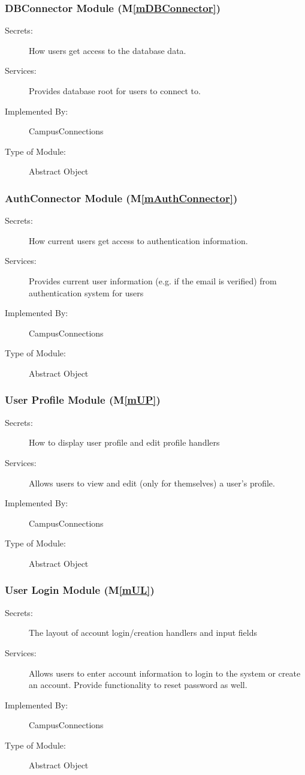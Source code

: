 \documentclass[12pt, titlepage]{article}
\newcommand{\mref}[1]{M\ref{#1}}
\begin{document}
\subsubsection{DBConnector Module (\mref{mDBConnector})}
\begin{description}
  \item[Secrets:]How users get access to the database data.
  \item[Services:]Provides database root for users to connect to.
  \item[Implemented By:] CampusConnections
  \item[Type of Module:] Abstract Object
\end{description}

\subsubsection{AuthConnector Module (\mref{mAuthConnector})}
\begin{description}
  \item[Secrets:]How current users get access to authentication information.
  \item[Services:]Provides current user information (e.g. if the email is verified) from authentication system for users
  \item[Implemented By:] CampusConnections
  \item[Type of Module:] Abstract Object
\end{description}

\subsubsection{User Profile Module (\mref{mUP})}
\begin{description}
  \item[Secrets:]How to display user profile and edit profile handlers
  \item[Services:]Allows users to view and edit (only for themselves) a user's profile.
  \item[Implemented By:] CampusConnections
  \item[Type of Module:] Abstract Object
\end{description}

\subsubsection{User Login Module (\mref{mUL})}
\begin{description}
  \item[Secrets:]The layout of account login/creation handlers and input fields
  \item[Services:]Allows users to enter account information to login to the system or create an account. Provide functionality to reset password as well.
  \item[Implemented By:] CampusConnections
  \item[Type of Module:] Abstract Object
\end{description}
\end{document}
